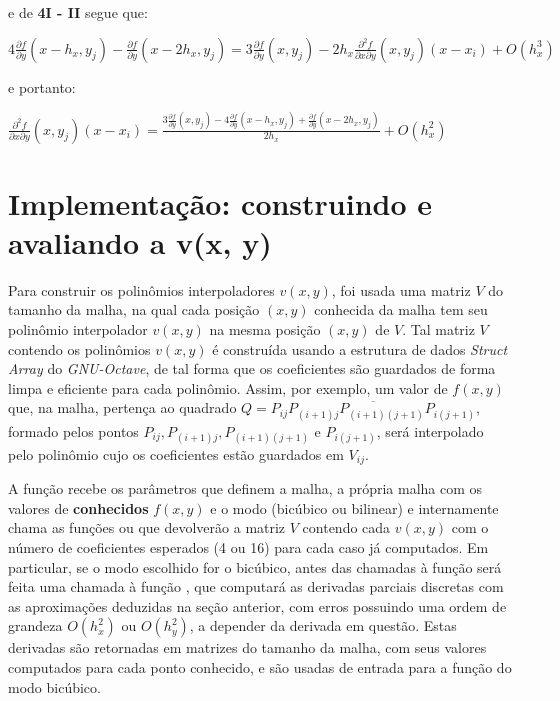 \documentclass[11pt]{article}
\begin{document}
  e de \textbf{4I - II} segue que:

  $4\frac{\partial f}{\partial y}(x - h_x, y_j) - \frac{\partial f}{\partial y}(x - 2h_x, y_j) = 3\frac{\partial f}{\partial y}(x, y_j) - 2h_x\frac{\partial^2 f}{\partial x \partial y}\left(x, y_j \right)\left(x - x_i \right) + O(h_x^3)$

  e portanto:

  $\frac{\partial^2 f}{\partial x \partial y}\left(x, y_j \right)\left(x - x_i \right) = \frac{3\frac{\partial f}{\partial y}(x, y_j) - 4\frac{\partial f}{\partial y}(x - h_x, y_j) + \frac{\partial f}{\partial y}(x - 2h_x, y_j)}{2h_x}  + O(h_x^2)$

  \pagebreak

  \section{Implementação: construindo e avaliando a v(x, y)}

  \indent\indent Para construir os polinômios interpoladores $v(x, y)$, foi usada uma matriz $V$ do tamanho da malha, na qual cada posição $(x, y)$ conhecida da malha
  tem seu polinômio interpolador $v(x, y)$ na mesma posição $(x, y)$ de $V$. Tal matriz $V$ contendo os polinômios $v(x, y)$ é construída usando a estrutura de dados \textit{Struct Array} do \textit{GNU-Octave},
  de tal forma que os coeficientes são guardados de forma limpa e eficiente para cada polinômio. Assim, por exemplo, um valor de $f(x, y)$ que, na malha, pertença ao quadrado
  $Q = \overline{P_{ij}P_{(i+1)j}P_{(i+1)(j+1)}P_{i(j+1)}}$, formado pelos pontos $P_{ij}, P_{(i+1)j}, P_{(i+1)(j+1)}$ e $P_{i(j+1)}$,
  será interpolado pelo polinômio cujo os coeficientes estão guardados em $V_{ij}$.

  A função {} recebe os parâmetros que definem a malha, a própria malha com os valores de \textbf{conhecidos} $f(x, y)$ e o modo (bicúbico ou bilinear) e internamente chama as funções
  {} ou {} que devolverão a matriz $V$ contendo cada $v(x, y)$ com o número de coeficientes esperados (4 ou 16) para cada caso já computados. Em particular,
  se o modo escolhido for o bicúbico, antes das chamadas à função {} será feita uma chamada à função {}, que computará as derivadas parciais discretas com as
  aproximações deduzidas na seção anterior, com erros possuindo uma ordem de grandeza $O(h_x^2)$ ou $O(h_y^2)$, a depender da derivada em questão. Estas derivadas são retornadas em matrizes do tamanho da
  malha, com seus valores computados para cada ponto conhecido, e são usadas de entrada para a função do modo bicúbico.
\end{document}
